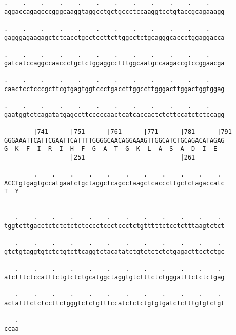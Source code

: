 \documentclass{article}
\begin{document}
\begin{Verbatim}
.    .    .    .    .    .    .    .    .    .    .    .    
aggaccagagcccgggcaaggtaggcctgctgccctccaaggtcctgtaccgcagaaagg
                                                            
.    .    .    .    .    .    .    .    .    .    .    .    
gagggagaagagctctcacctgcctccttcttggcctctgcagggcaccctggaggacca
                                                            
.    .    .    .    .    .    .    .    .    .    .    .    
gatcatccaggccaaccctgctctggaggcctttggcaatgccaagaccgtccggaacga
                                                            
.    .    .    .    .    .    .    .    .    .    .    .    
caactcctcccgcttcgtgagtggtccctgaccttggccttgggacttggactggtggag
                                                            
.    .    .    .    .    .    .    .    .    .    .    .    
gaatggtctcagatatgagccttcccccaactcatcaccactctcttccatctctccagg
                                                            
        |741      |751      |761      |771      |781      |791
GGGAAATTCATTCGAATTCATTTTGGGGCAACAGGAAAGTTGGCATCTGCAGACATAGAG
G  K  F  I  R  I  H  F  G  A  T  G  K  L  A  S  A  D  I  E  
                  |251                          |261        
  
        .    .    .    .    .    .    .    .    .    .    . 
ACCTgtgagtgccatgaatctgctaggctcagcctaagctcacccttgctctagaccatc
T  Y                                                        
                                                            
  
   .    .    .    .    .    .    .    .    .    .    .    . 
tggtcttgacctctctctctctcccctccctccctctgtttttctcctctttaagtctct
                                                            
   .    .    .    .    .    .    .    .    .    .    .    . 
gtctgtaggtgtctctgtcttcaggtctacatatctgtctctctctgagacttcctctgc
                                                            
   .    .    .    .    .    .    .    .    .    .    .    . 
atctttctccatttctgtctctgcatggctaggtgtctttctctgggatttctctctgag
                                                            
   .    .    .    .    .    .    .    .    .    .    .    . 
actatttctctccttctgggtctctgtttccatctctctgtgtgatctctttgtgtctgt
                                                            
   .
ccaa
    

\end{Verbatim}
\end{document}
